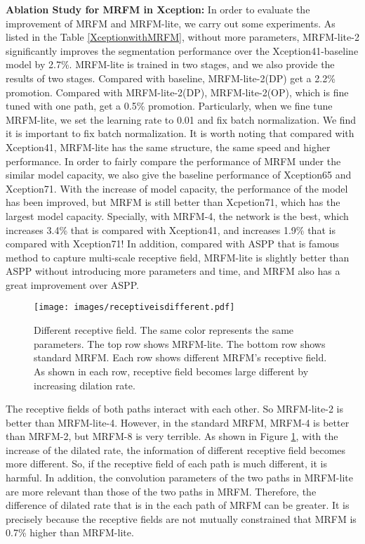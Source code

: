 \documentclass[final]{cvpr}
\begin{document}
\textbf{Ablation Study for MRFM in Xception: } In order to evaluate the improvement of MRFM and MRFM-lite, we carry out some experiments. As listed in the Table \ref{XceptionwithMRFM}, without more parameters, MRFM-lite-2 significantly improves the segmentation performance over the Xception41-baseline model by 2.7\%. MRFM-lite is trained in two stages, and we also provide the results of two stages. Compared with baseline, MRFM-lite-2(DP) get a 2.2\% promotion. Compared with MRFM-lite-2(DP), MRFM-lite-2(OP), which is fine tuned with one path, get a 0.5\% promotion. Particularly, when we fine tune MRFM-lite, we set the learning rate to 0.01 and fix batch normalization. We find it is important to fix batch normalization. It is worth noting that compared with Xception41, MRFM-lite has the same structure, the same speed and higher performance. In order to fairly compare the performance of MRFM under the similar model capacity, we also give the baseline performance of Xception65 and Xception71. With the increase of model capacity, the performance of the model has been improved, but MRFM is still better than Xcpetion71, which has the largest model capacity. Specially, with MRFM-4, the network is the best, which increases 3.4\% that is compared with Xception41, and increases 1.9\% that is compared with Xception71! In addition, compared with ASPP that is famous method to capture multi-scale receptive field, MRFM-lite is slightly better than ASPP without introducing more parameters and time, and MRFM also has a great improvement over ASPP.


\begin{figure}[t]
\begin{center}
\texttt{[image: images/receptiveisdifferent.pdf]}
\end{center}
\caption{Different receptive field. The same color represents the same parameters. The top row shows MRFM-lite. The bottom row shows standard MRFM. Each row shows different MRFM's receptive field. As shown in each row, receptive field becomes large different by increasing dilation rate.}
\label{receptive fields}
\end{figure}


The receptive fields of both paths interact with each other. So MRFM-lite-2 is better than MRFM-lite-4. However, in the standard MRFM, MRFM-4 is better than MRFM-2, but MRFM-8 is very terrible. As shown in Figure \ref{receptive fields}, with the increase of the dilated rate, the information of different receptive field becomes more different. So, if the receptive field of each path is much different, it is harmful. In addition, the convolution parameters of the two paths in MRFM-lite are more relevant than those of the two paths in MRFM. Therefore, the difference of dilated rate that is in the each path of MRFM can be greater. It is precisely because the receptive fields are not mutually constrained that MRFM is 0.7\% higher than MRFM-lite.
\end{document}

